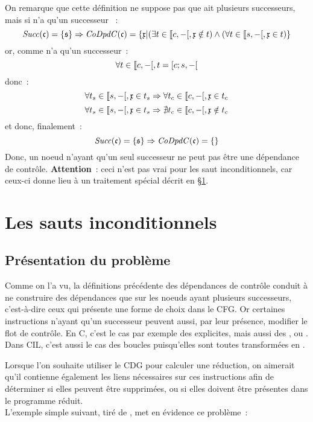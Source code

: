 On remarque que cette définition ne suppose pas que  ait plusieurs
successeurs, mais si  n'a qu'un successeur ~:
$$
\mathit{Succ}(\mathfrak{c}) = \{ \mathfrak{s} \} \Rightarrow
\mathit{CoDpdC}(\mathfrak{c}) = \{\mathfrak{x} | (\exists t \in \llbracket c, -[, \mathfrak{x} \notin t)
\wedge (\forall t \in \llbracket s, -[, \mathfrak{x} \in t) \}
$$
or, comme  n'a qu'un successeur~:
$$
\forall t \in \llbracket c, -[, t = [c; s, -[
$$
donc~:
$$
\forall t_s \in \llbracket s, -[, \mathfrak{x} \in t_s
\Rightarrow \forall t_c \in \llbracket c, -[, \mathfrak{x} \in t_c
$$
$$
\forall t_s \in \llbracket s, -[, \mathfrak{x} \in t_s
\Rightarrow \nexists t_c \in \llbracket c, -[, \mathfrak{x} \notin t_c
$$
et donc, finalement~:
$$
\mathit{Succ}(\mathfrak{c}) = \{ \mathfrak{s} \} \Rightarrow \mathit{CoDpdC}(\mathfrak{c}) = \{\}
$$
Donc, un noeud n'ayant qu'un seul successeur ne peut pas être une dépendance de
contrôle. {\bf Attention}~: ceci n'est pas vrai pour les saut inconditionnels,
car ceux-ci donne lieu à un traitement spécial décrit en \S\ref{sec-goto}.


\section{Les sauts inconditionnels}\label{sec-goto}

\subsection{Présentation du problème}

Comme on l'a vu,
la définitions précédente des dépendances de contrôle conduit à
ne construire des dépendances que sur les noeuds ayant plusieurs successeurs,
c'est-à-dire ceux qui présente une forme de choix dans le CFG.
Or certaines instructions n'ayant qu'un successeur
peuvent aussi, par leur présence, modifier le flot de contrôle.
En C, c'est le cas par exemple des  explicites,
mais aussi des  ,  ou .
Dans CIL, c'est aussi le cas des boucles puisqu'elles sont toutes transformées
en .

Lorsque l'on souhaite utiliser le CDG pour calculer une réduction,
on aimerait
qu'il contienne également les liens nécessaires sur ces instructions
afin de déterminer si elles peuvent être supprimées,
ou si elles doivent être présentes dans le programme réduit.\\

L'exemple simple suivant, tiré de \cite{Choi94}, met en évidence ce problème~:

